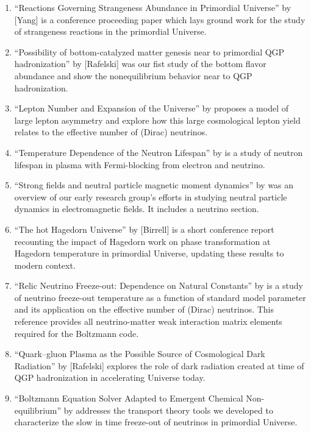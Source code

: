 \begin{enumerate}
%
\item ``Reactions Governing Strangeness Abundance in Primordial Universe'' by [Yang] is a conference proceeding paper which lays ground work for the study of strangeness reactions in the primordial Universe. 
%
\item ``Possibility of bottom-catalyzed matter genesis near to primordial QGP hadronization'' by [Rafelski] was our fist study of the bottom flavor abundance and show the nonequilibrium behavior near to QGP hadronization. 
%
\item ``Lepton Number and Expansion of the Universe'' by  proposes a model of large lepton asymmetry and explore how this large cosmological lepton yield relates to the effective number of (Dirac) neutrinos.
%
\item ``Temperature Dependence of the Neutron Lifespan'' by  is a study of neutron lifespan in plasma with Fermi-blocking from electron and neutrino. 
%
\item ``Strong fields and neutral particle magnetic moment dynamics'' by  was an overview of our early research group's efforts in studying neutral particle dynamics in electromagnetic fields. It includes a neutrino section. 
%
\item ``The hot Hagedorn Universe'' by [Birrell] is a short conference report recounting the impact of Hagedorn work on phase transformation at Hagedorn temperature in primordial Universe, updating these results to modern context.
%
\item ``Relic Neutrino Freeze-out: Dependence on Natural Constants'' by  is a study of neutrino freeze-out temperature as a function of standard model parameter and its application on the effective number of (Dirac) neutrinos. This reference provides all neutrino-matter weak interaction matrix elements required for the Boltzmann code.
%
\item ``Quark–gluon Plasma as the Possible Source of Cosmological Dark Radiation'' by [Rafelski] explores the role of dark radiation created at time of QGP hadronization in accelerating Universe today.
%
\item ``Boltzmann Equation Solver Adapted to Emergent Chemical Non-equilibrium'' by  addresses the transport theory tools we developed to characterize the slow in time freeze-out of neutrinos in primordial Universe.

\end{enumerate}

